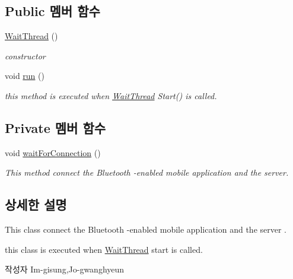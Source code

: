 \subsection*{Public 멤버 함수}
\begin{DoxyCompactItemize}
\item 
\hyperlink{classkr_1_1ac_1_1kookmin_1_1cs_1_1bluetooth_1_1_wait_thread_a201cbdb2225e5719cd079c0e5adf8430}{Wait\+Thread} ()
\begin{DoxyCompactList}\small\item\em constructor \end{DoxyCompactList}\item 
void \hyperlink{classkr_1_1ac_1_1kookmin_1_1cs_1_1bluetooth_1_1_wait_thread_accab2e120919b2591531286efda41c03}{run} ()
\begin{DoxyCompactList}\small\item\em this method is executed when \hyperlink{classkr_1_1ac_1_1kookmin_1_1cs_1_1bluetooth_1_1_wait_thread}{Wait\+Thread} Start() is called. \end{DoxyCompactList}\end{DoxyCompactItemize}
\subsection*{Private 멤버 함수}
\begin{DoxyCompactItemize}
\item 
void \hyperlink{classkr_1_1ac_1_1kookmin_1_1cs_1_1bluetooth_1_1_wait_thread_a67b7f1b5d2691ea47589b2c32363a3bd}{wait\+For\+Connection} ()
\begin{DoxyCompactList}\small\item\em This method connect the Bluetooth -\/enabled mobile application and the server. \end{DoxyCompactList}\end{DoxyCompactItemize}


\subsection{상세한 설명}
This class connect the Bluetooth -\/enabled mobile application and the server . 

this class is executed when \hyperlink{classkr_1_1ac_1_1kookmin_1_1cs_1_1bluetooth_1_1_wait_thread}{Wait\+Thread} start is called. \begin{DoxyAuthor}{작성자}
Im-\/gisung,Jo-\/gwanghyeun 
\end{DoxyAuthor}


